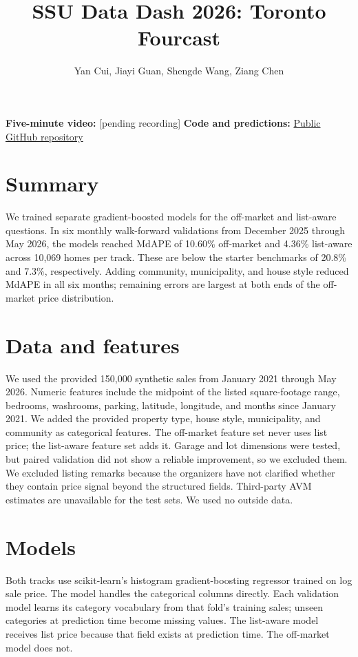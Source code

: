\documentclass[10pt]{article}
\title{SSU Data Dash 2026: Toronto Fourcast}
\author{Yan Cui, Jiayi Guan, Shengde Wang, Ziang Chen}
\date{}
\begin{document}
\maketitle
\vspace{-1.2em}

\textbf{Five-minute video:} [pending recording]\hfill
\textbf{Code and predictions:} \href{https://github.com/billchenziang33/toronto-home-price-prediction-2026}{Public GitHub repository}

\section*{Summary}
We trained separate gradient-boosted models for the off-market and list-aware questions. In six monthly walk-forward validations from December 2025 through May 2026, the models reached MdAPE of 10.60\% off-market and 4.36\% list-aware across 10,069 homes per track. These are below the starter benchmarks of 20.8\% and 7.3\%, respectively. Adding community, municipality, and house style reduced MdAPE in all six months; remaining errors are largest at both ends of the off-market price distribution.

\section{Data and features}
We used the provided 150,000 synthetic sales from January 2021 through May 2026. Numeric features include the midpoint of the listed square-footage range, bedrooms, washrooms, parking, latitude, longitude, and months since January 2021. We added the provided property type, house style, municipality, and community as categorical features. The off-market feature set never uses list price; the list-aware feature set adds it. Garage and lot dimensions were tested, but paired validation did not show a reliable improvement, so we excluded them. We excluded listing remarks because the organizers have not clarified whether they contain price signal beyond the structured fields. Third-party AVM estimates are unavailable for the test sets. We used no outside data.

\section{Models}
Both tracks use scikit-learn's histogram gradient-boosting regressor trained on log sale price. The model handles the categorical columns directly. Each validation model learns its category vocabulary from that fold's training sales; unseen categories at prediction time become missing values. The list-aware model receives list price because that field exists at prediction time. The off-market model does not.
\end{document}

